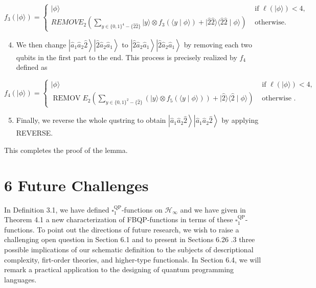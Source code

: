 \documentclass[10pt]{article}
\begin{document}
$$
f_{3}(|\phi\rangle)= \begin{cases}|\phi\rangle & \text { if } \ell(|\phi\rangle)<4, \\ R E M O V E_{2}\left(\sum_{y \in\{0,1\}^{4}-\{\hat{2} \hat{2}\}}|y\rangle \otimes f_{3}(\langle y \mid \phi\rangle)+|\hat{2} \hat{2}\rangle\langle\hat{2} \hat{2} \mid \phi\rangle\right) & \text { otherwise. }\end{cases}
$$

\begin{enumerate}
  \setcounter{enumi}{3}
  \item We then change $\left|\hat{a}_{1} \hat{a}_{2} \hat{2}\right\rangle\left|\hat{2} \hat{a}_{2} \hat{a}_{1}\right\rangle$ to $\left|\hat{2} \hat{a}_{2} \hat{a}_{1}\right\rangle\left|\hat{2} \hat{a}_{2} \hat{a}_{1}\right\rangle$ by removing each two qubits in the first part to the end. This process is precisely realized by $f_{4}$ defined as
\end{enumerate}

$$
f_{4}(|\phi\rangle)= \begin{cases}|\phi\rangle & \text { if } \ell(|\phi\rangle)<4, \\ \operatorname{REMOV} E_{2}\left(\sum_{y \in\{0,1\}^{2}-\{\hat{2}\}}\left(|y\rangle \otimes f_{5}(\langle y \mid \phi\rangle)\right)+|\hat{2}\rangle\langle\hat{2} \mid \phi\rangle\right) & \text { otherwise } .\end{cases}
$$

\begin{enumerate}
  \setcounter{enumi}{4}
  \item Finally, we reverse the whole qustring to obtain $\left|\hat{a}_{1} \hat{a}_{2} \hat{2}\right\rangle\left|\hat{a}_{1} \hat{a}_{2} \hat{2}\right\rangle$ by applying REVERSE.
\end{enumerate}

This completes the proof of the lemma.

\section*{6 Future Challenges}
In Definition 3.1, we have defined $\square_{1}^{\mathrm{QP}}$-functions on $\mathcal{H}_{\infty}$ and we have given in Theorem 4.1 a new characterization of FBQP-functions in terms of these $\square_{1}^{\mathrm{QP}}$-functions. To point out the directions of future research, we wish to raise a challenging open question in Section 6.1 and to present in Sections 6.26 .3 three possible implications of our schematic definition to the subjects of descriptional complexity, firt-order theories, and higher-type functionals. In Section 6.4, we will remark a practical application to the designing of quantum programming languages.
\end{document}
